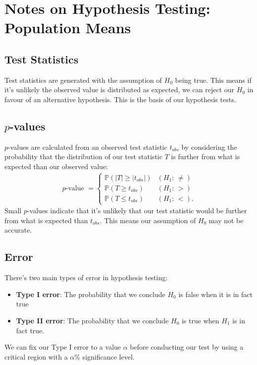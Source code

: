 \documentclass[a4paper, 12pt, twoside]{article}
\begin{document}
\newpage

\section{Notes on Hypothesis Testing: Population Means}

\subsection{Test Statistics}

Test statistics are generated with the assumption of $H_0$ being true.
This means if it's unlikely the observed value is distributed as
expected, we can reject our $H_0$ in favour of an alternative
hypothesis. This is the basis of our hypothesis tests.

\subsection{$p$-values}

$p$-values are calculated from an observed test statistic $t_{obs}$
by considering the probability that the distribution of our
test statistic $T$ is further from what is expected than our observed
value:
\begin{align*}
    p\text{-value } = \begin{cases}
        \mathbb{P}(|T| \geq |t_{obs}|) & (H_1 : \, \neq) \\
        \mathbb{P}(T \geq t_{obs})     & (H_1 : \, >)    \\
        \mathbb{P}(T \leq t_{obs})     & (H_1 : \, <).
    \end{cases}
\end{align*}
Small $p$-values indicate that it's unlikely that our
test statistic would be further from what is expected than
$t_{obs}$. This means our assumption of $H_0$ may not be
accurate.

\subsection{Error}

There's two main types of error in hypothesis testing:
\begin{itemize}
    \item \textbf{Type I error}: The probability that we
          conclude $H_0$ is false when it is in fact true
    \item \textbf{Type II error}: The probability that we
          conclude $H_0$ is true when $H_1$ is in fact true.
\end{itemize}
We can fix our Type I error to a value $\alpha$ before conducting
our test by using a critical region with a $\alpha\%$
significance level.
\end{document}
